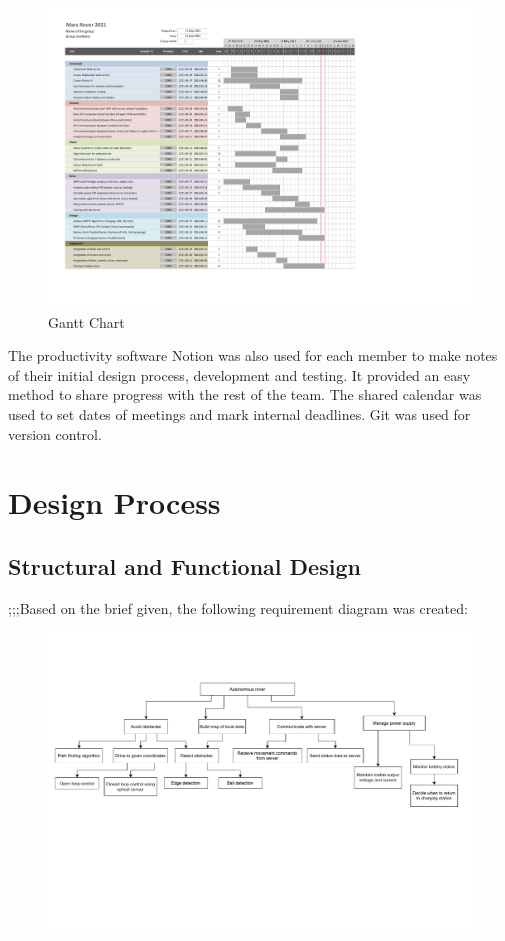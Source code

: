 \documentclass[10pt,twoside]{article}
\begin{document}
\begin{figure}[hbt]
    \centering
    \includegraphics[scale = 0.6,trim={1cm 3cm 8cm 0},clip]{GanttChart.pdf}
    \caption{Gantt Chart}
    \label{fig:GanttChart}
\end{figure}

The productivity software Notion was also used for each member to make notes of their initial design process, development and testing. It provided an easy method to share progress with the rest of the team. The shared calendar was used to set dates of meetings and mark internal deadlines. Git was used for version control.

\newpage
\section{Design Process}
\subsection{Structural and Functional Design}

;;;Based on the brief given, the following requirement diagram was created:

\begin{figure}[hbt]
    \centering
    \includegraphics[scale = 0.6]{Requirements.pdf}
    \caption{}
    \label{fig:RequirementDiagram}
\end{figure}
\end{document}
